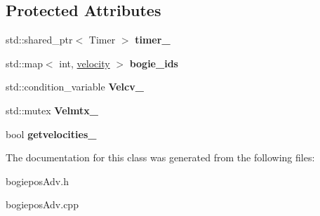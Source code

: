 \subsection*{Protected Attributes}
\begin{DoxyCompactItemize}
\item 
\mbox{\label{classBogieposAdv_a4fd97d2f8f9ba65028cc3f92960ce2db}} 
std\+::shared\+\_\+ptr$<$ Timer $>$ {\bfseries timer\+\_\+}
\item 
\mbox{\label{classBogieposAdv_aaba3fb9369708bc8b21c10aab41d7441}} 
std\+::map$<$ int, \hyperlink{structvelocity}{velocity} $>$ {\bfseries bogie\+\_\+ids}
\item 
\mbox{\label{classBogieposAdv_ab23f42b77901d0a6add7364a3a63b77c}} 
std\+::condition\+\_\+variable {\bfseries Velcv\+\_\+}
\item 
\mbox{\label{classBogieposAdv_adfe1922b518765c4f6ca3f496597d81f}} 
std\+::mutex {\bfseries Velmtx\+\_\+}
\item 
\mbox{\label{classBogieposAdv_a6cd66259846f16c3025c3bb0cb06239a}} 
bool {\bfseries getvelocities\+\_\+}
\end{DoxyCompactItemize}


The documentation for this class was generated from the following files\+:\begin{DoxyCompactItemize}
\item 
bogiepos\+Adv.\+h\item 
bogiepos\+Adv.\+cpp\end{DoxyCompactItemize}

